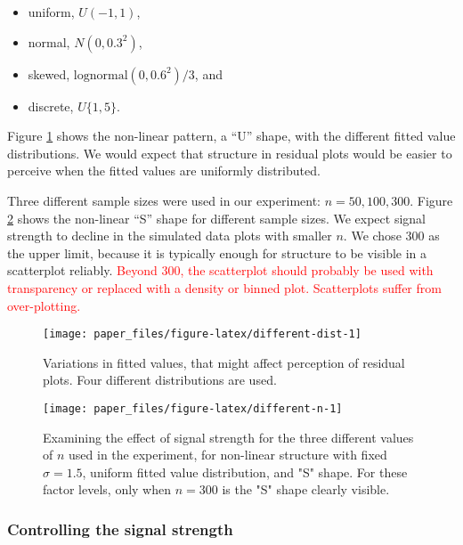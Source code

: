 \documentclass[]{interact}
\theoremstyle{plain}%
\theoremstyle{definition}
\theoremstyle{remark}
\providecommand{\tightlist}{%
  \setlength{\itemsep}{0pt}\setlength{\parskip}{0pt}}
\def\tightlist{}
\begin{document}
\begin{itemize}
\tightlist
\item
  uniform, \(U(-1, 1)\),
\item
  normal, \(N(0, 0.3^2)\),
\item
  skewed, \(\text{lognormal}(0, 0.6^2)/3\), and
\item
  discrete, \(U\{1, 5\}\).
\end{itemize}

\noindent Figure \ref{fig:different-dist} shows the non-linear pattern,
a ``U'' shape, with the different fitted value distributions. We would
expect that structure in residual plots would be easier to perceive when
the fitted values are uniformly distributed.

Three different sample sizes were used in our experiment:
\(n = 50, 100, 300\). Figure \ref{fig:different-n} shows the non-linear
``S'' shape for different sample sizes. We expect signal strength to
decline in the simulated data plots with smaller \(n\). We chose 300 as
the upper limit, because it is typically enough for structure to be
visible in a scatterplot reliably.
\textcolor{red}{Beyond 300, the scatterplot should probably be used with transparency or replaced with a density or binned plot. Scatterplots suffer from over-plotting.}

\begin{figure}

{\centering \texttt{[image: paper\_files/figure-latex/different-dist-1]} 

}

\caption{Variations in fitted values, that might affect perception of residual plots. Four different distributions are used.}\label{fig:different-dist}
\end{figure}

\begin{figure}

{\centering \texttt{[image: paper\_files/figure-latex/different-n-1]} 

}

\caption{Examining the effect of signal strength for the three different values of $n$ used in the experiment, for non-linear structure with fixed $\sigma = 1.5$, uniform fitted value distribution, and "S" shape. For these factor levels, only when $n = 300$ is the "S" shape clearly visible.}\label{fig:different-n}
\end{figure}

\hypertarget{controlling-the-signal-strength}{%
\subsubsection{Controlling the signal
strength}\label{controlling-the-signal-strength}}
\end{document}
